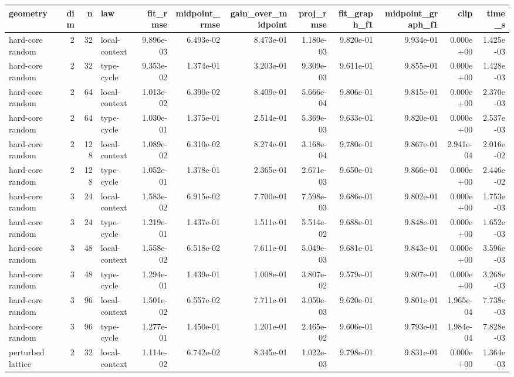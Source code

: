 \begin{tabular}{lrrlrrrrrrrr}
\toprule
geometry & dim & n & law & fit_rmse & midpoint_rmse & gain_over_midpoint & proj_rmse & fit_graph_f1 & midpoint_graph_f1 & clip & time_s \\
\midrule
hard-core random & 2 & 32 & local-context & 9.896e-03 & 6.493e-02 & 8.473e-01 & 1.180e-03 & 9.820e-01 & 9.934e-01 & 0.000e+00 & 1.425e-03 \\
hard-core random & 2 & 32 & type-cycle & 9.353e-02 & 1.374e-01 & 3.203e-01 & 9.309e-03 & 9.611e-01 & 9.855e-01 & 0.000e+00 & 1.428e-03 \\
hard-core random & 2 & 64 & local-context & 1.013e-02 & 6.390e-02 & 8.409e-01 & 5.666e-04 & 9.806e-01 & 9.815e-01 & 0.000e+00 & 2.370e-03 \\
hard-core random & 2 & 64 & type-cycle & 1.030e-01 & 1.375e-01 & 2.514e-01 & 5.369e-03 & 9.633e-01 & 9.820e-01 & 0.000e+00 & 2.537e-03 \\
hard-core random & 2 & 128 & local-context & 1.089e-02 & 6.310e-02 & 8.274e-01 & 3.168e-04 & 9.780e-01 & 9.867e-01 & 2.941e-04 & 2.016e-02 \\
hard-core random & 2 & 128 & type-cycle & 1.052e-01 & 1.378e-01 & 2.365e-01 & 2.671e-03 & 9.650e-01 & 9.866e-01 & 0.000e+00 & 2.446e-02 \\
hard-core random & 3 & 24 & local-context & 1.583e-02 & 6.915e-02 & 7.700e-01 & 7.598e-03 & 9.686e-01 & 9.802e-01 & 0.000e+00 & 1.753e-03 \\
hard-core random & 3 & 24 & type-cycle & 1.219e-01 & 1.437e-01 & 1.511e-01 & 5.514e-02 & 9.688e-01 & 9.848e-01 & 0.000e+00 & 1.652e-03 \\
hard-core random & 3 & 48 & local-context & 1.558e-02 & 6.518e-02 & 7.611e-01 & 5.049e-03 & 9.681e-01 & 9.843e-01 & 0.000e+00 & 3.596e-03 \\
hard-core random & 3 & 48 & type-cycle & 1.294e-01 & 1.439e-01 & 1.008e-01 & 3.807e-02 & 9.579e-01 & 9.807e-01 & 0.000e+00 & 3.268e-03 \\
hard-core random & 3 & 96 & local-context & 1.501e-02 & 6.557e-02 & 7.711e-01 & 3.050e-03 & 9.620e-01 & 9.801e-01 & 1.965e-04 & 7.738e-03 \\
hard-core random & 3 & 96 & type-cycle & 1.277e-01 & 1.450e-01 & 1.201e-01 & 2.465e-02 & 9.606e-01 & 9.793e-01 & 1.984e-04 & 7.828e-03 \\
perturbed lattice & 2 & 32 & local-context & 1.114e-02 & 6.742e-02 & 8.345e-01 & 1.022e-03 & 9.798e-01 & 9.831e-01 & 0.000e+00 & 1.364e-03 \\

\end{tabular}
